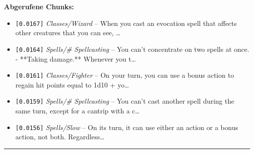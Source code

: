 \noindent\textbf{Abgerufene Chunks:}
\begin{itemize}[noitemsep, topsep=2pt]
  \item[\textbf{\#1}] \texttt{[0.0167]} \textit{Classes/Wizard} -- When you cast an evocation spell that affects other creatures that you can see, \ldots
  \item[\textbf{\#2}] \texttt{[0.0164]} \textit{Spells/# Spellcasting} -- You can't concentrate on two spells at once. - **Taking damage.** Whenever you t\ldots
  \item[\textbf{\#3}] \texttt{[0.0161]} \textit{Classes/Fighter} -- On your turn, you can use a bonus action to regain hit points equal to 1d10 + yo\ldots
  \item[\textbf{\#4}] \texttt{[0.0159]} \textit{Spells/# Spellcasting} -- You can't cast another spell during the same turn, except for a cantrip with a c\ldots
  \item[\textbf{\#5}] \texttt{[0.0156]} \textit{Spells/Slow} -- On its turn, it can use either an action or a bonus action, not both. Regardless\ldots
\end{itemize}
\vspace{4pt}
\hrule
\vspace{6pt}
